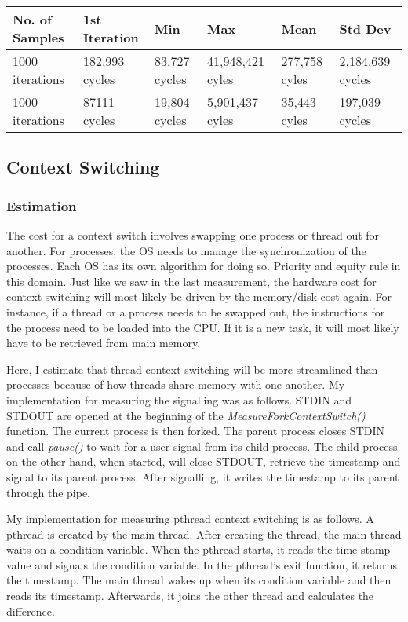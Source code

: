 \documentclass[paper=a4, fontsize=11pt]{scrartcl}
\numberwithin{equation}{section}        %
\numberwithin{figure}{section}          %
\numberwithin{table}{section}               %
\begin{document}
\begin{center}
    \begin{tabular}{ | l | l | l | l | l | l |}
    \hline
    No. of Samples & 1st Iteration & Min & Max & Mean & Std Dev \\ \hline
    1000 iterations & 182,993 cycles & 83,727 cycles & 41,948,421 cyles & 277,758 cyles & 2,184,639 cycles \\ 
    1000 iterations & 87111 cycles & 19,804 cycles & 5,901,437 cyles & 35,443 cyles & 197,039 cycles \\ 
    \hline
    \end{tabular}
\end{center}

\subsection{Context Switching}

\subsubsection{Estimation}

The cost for a context switch involves swapping one process or thread out for another.  For processes, the OS needs to manage the synchronization of the processes.  Each OS has its own algorithm for doing so.  Priority and equity rule in this domain.  Just like we saw in the last measurement, the hardware cost for context switching will most likely be driven by the memory/disk cost again.  For instance, if a thread or a process needs to be swapped out, the instructions for the process need to be loaded into the CPU.  If it is a new task, it will most likely have to be retrieved from main memory.

Here, I estimate that thread context switching will be more streamlined than processes because of how threads share memory with one another.  My implementation for measuring the signalling was as follows.  STDIN and STDOUT are opened at the beginning of the  \textit{MeasureForkContextSwitch()} function.  The current process is then forked.  The parent process closes STDIN and call \textit{pause()} to wait for a user signal from its child process.  The child process on the other hand, when started, will close STDOUT, retrieve the timestamp and signal to its parent process.  After signalling, it writes the timestamp to its parent through the pipe.

My implementation for measuring pthread context switching is as follows.  A pthread is created by the main thread.  After creating the thread, the main thread waits on a condition variable.  When the pthread starts, it reads the time stamp value and signals the condition variable.  In the pthread's exit function, it returns the timestamp.  The main thread wakes up when its condition variable and then reads its timestamp.  Afterwards, it joins the other thread and calculates the difference.
\end{document}
